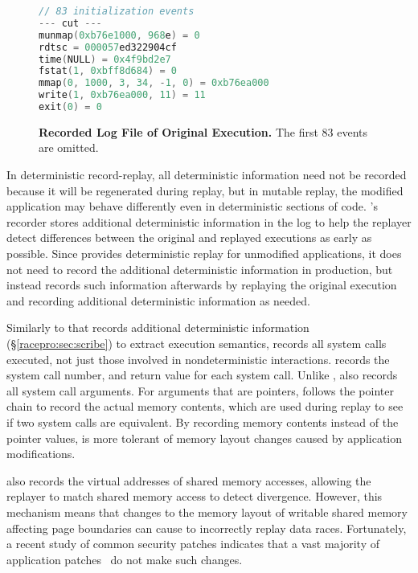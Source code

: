 \begin{figure}
\centering
\begin{minipage}{.58\textwidth}
\small
\begin{rbox}
\begin{lstlisting}[framexleftmargin=5pt,language=C,basicstyle=\ttfamily]
// 83 initialization events
--- cut ---
munmap(0xb76e1000, 968e) = 0
rdtsc = 000057ed322904cf
time(NULL) = 0x4f9bd2e7
fstat(1, 0xbff8d684) = 0
mmap(0, 1000, 3, 34, -1, 0) = 0xb76ea000
write(1, 0xb76ea000, 11) = 11
exit(0) = 0
\end{lstlisting}
\end{rbox}
\end{minipage}
\caption{{\bf Recorded Log File of Original Execution.} The first 83 events are omitted. }
\label{dora:fig:example-orig-log}
\end{figure}

In deterministic record-replay, all deterministic information need not be
recorded because it will be regenerated during replay, but in mutable
replay, the modified application may behave differently even in
deterministic sections of code.  {\dora}'s recorder stores
additional deterministic information in the log to help the replayer detect
differences between the original and replayed
executions as early as possible.
Since {\dora} provides deterministic replay for
unmodified applications, it does not need to record the additional
deterministic information in production, but instead records such
information afterwards by replaying the original
execution and recording additional deterministic information as
needed.

Similarly to \racepro that records additional deterministic information
(\S\ref{racepro:sec:scribe}) to extract execution semantics,
{\dora} records all system calls executed, not just those
involved in nondeterministic interactions.  {\dora} records the
system call number, and return value for each system
call. Unlike \racepro, \dora also records all system call arguments.
For arguments that are pointers, {\dora} follows the pointer
chain to record the actual memory contents, which are used during
replay to see if two system calls are equivalent.  By recording memory
contents instead of the pointer values, {\dora} is more tolerant of
memory layout changes caused by application modifications.

{\dora} also records the virtual addresses of shared memory accesses,
allowing the replayer to match shared memory access to detect divergence.
However, this mechanism means that changes to the memory layout of
writable shared memory affecting page
boundaries can cause {\dora} to incorrectly replay data races.
Fortunately, a recent study of common security patches indicates that
a vast majority of application
patches~\cite{mreplay-feas} do not make such changes.


